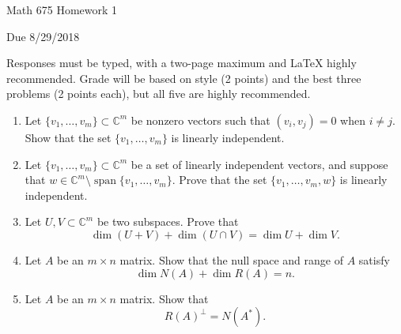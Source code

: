 \documentclass[12pt,letterpaper,reqno]{amsart}
\newcommand{\C}{\mathbb C}
\begin{document}
\thispagestyle{empty}
\centerline{\Large Math 675 Homework 1}
\centerline{Due 8/29/2018}
\vspace{.25in}

Responses must be typed, with a two-page maximum and LaTeX highly recommended. Grade will be based on style (2 points) and the best three problems (2 points each), but all five are highly recommended.

\begin{enumerate}[1.]
\item Let $\{v_1, \ldots, v_m\}\subset \C^m$ be nonzero vectors such that $(v_i, v_j)=0$ when $i\neq j$. Show that the set $\{v_1, \ldots, v_m\}$ is linearly independent.
\item Let $\{v_1, \ldots, v_m\}\subset \C^m$ be a set of linearly independent vectors, and suppose that $w\in \C^m\setminus \operatorname{span}\{v_1, \ldots, v_m\}$.  Prove that the set $\{v_1, \ldots, v_m, w\}$ is linearly independent.
\item Let $U, V\subset \C^m$ be two subspaces. Prove that
$$\dim(U+V)+\dim(U\cap V)=\dim U + \dim V.$$
\item Let $A$ be an $m\times n$ matrix. Show that the null space and range of $A$ satisfy
$$\dim N(A)+\dim R(A)=n.$$
\item Let $A$ be an $m\times n$ matrix. Show that 
$$R(A)^\perp =N(A^*).$$
\end{enumerate}
\end{document}
